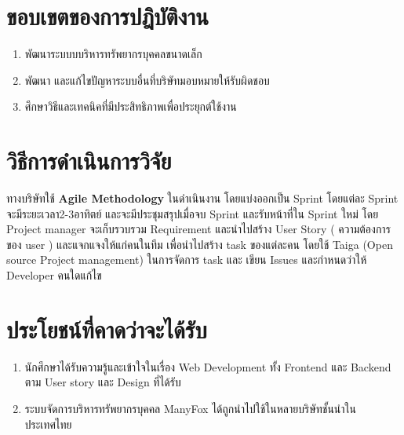 \section{ขอบเขตของการปฎิบัติงาน}
\begin{enumerate}
  \item พัฒนาระบบบบริหารทรัพยากรบุคคลขนาดเล็ก
  \item พัฒนา และแก้ไขปัญหาระบบอื่นที่บริษัทมอบหมายให้รับผิดชอบ
  \item ศึกษาวิธีและเทคนิคที่มีประสิทธิภาพเพื่อประยุกต์ใช้งาน
\end{enumerate}

\section{วิธีการดำเนินการวิจัย}

ทางบริษัทใช้ \textbf{Agile Methodology} ในดำเนินงาน โดยแบ่งออกเป็น Sprint  โดยแต่ละ Sprint จะมีระยะเวลา2-3อาทิตย์ และจะมีประชุมสรุปเมื่อจบ Sprint และรับหน้าที่ใน Sprint ใหม่ โดย Project manager จะเก็บรวบรวม Requirement และนำไปสร้าง User Story ( ความต้องการของ user ) และแจกแจงให้แก่คนในทีม เพื่อนำไปสร้าง task ของแต่ละคน โดยใช้ Taiga (Open source Project management) ในการจัดการ task และ เขียน Issues และกำหนดว่าให้ Developer คนใดแก้ไข



\section{ประโยชน์ที่คาดว่าจะได้รับ}
\begin{enumerate}
  \item นักศึกษาได้รับความรู้และเข้าใจในเรื่อง Web Development ทั้ง Frontend และ Backend ตาม User story และ Design ที่ได้รับ
  \item ระบบจัดการบริหารทรัพยากรบุคคล ManyFox ได้ถูกนำไปใช้ในหลายบริษัทชั้นนำในประเทศไทย
\end{enumerate}